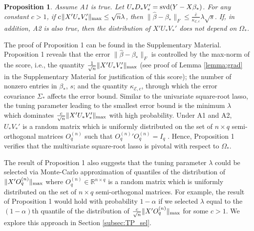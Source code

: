 \documentclass[12pt]{article}
\newtheorem{prop}{Proposition}
\begin{document}
\begin{prop}
Assume A1 is true. Let $U_* D_* V_*' = {\rm svd}(Y - X\beta_*)$. For any constant $c > 1$,  if $c \hspace{1pt} \|X'U_* V_*'\|_{\rm max} \leq \sqrt{n} \lambda$, then
$\|\hat{\beta} - \beta_*\|_F \leq \frac{\bar{c}}{\kappa_{\mathcal{E},c}}\lambda \sqrt{s}.$
If, in addition, A2 is also true, then the distribution of $X'U_*V_*'$ does not depend on $\Omega_*$. 
\end{prop}
The proof of Proposition 1 can be found in the Supplementary Material. 
Proposition 1 reveals that the error $\|\hat{\beta} - \beta_*\|_F$ is controlled by the max-norm of the score, i.e., the quantity $\frac{1}{\sqrt{n}}\|X'U_* V_*'\|_{\rm max}$ (see proof of Lemma \ref{lemma:grad} in the Supplementary Material for justification of this score); the number of nonzero entries in $\beta_*$, $s$;  and the quantity $\kappa_{\mathcal{E},c}$, through which the error covariance $\Sigma_*$ affects the error bound. Similar to the univariate square-root lasso, the tuning parameter leading to the smallest error bound is the minimum $\lambda$ which dominates $\frac{c}{\sqrt{n}}\|X'U_*V_*'\|_{\rm max}$ with high probability. %
Under A1 and A2, $U_* V_*'$ is a random matrix which is uniformly distributed on the set of $n \times q$ semi-orthogonal matrices $O^{(n)}_q$ such that ${O^{(n)}_q}'O^{(n)}_q = I_q$ \citep{eaton}. Hence, Proposition 1 verifies that the multivariate square-root lasso is pivotal with respect to $\Omega_*$. 


The result of Proposition 1 also suggests that the tuning parameter $\lambda$ could be selected via Monte-Carlo approximation of quantiles of the distribution of $\|X'O^{(n)}_q\|_{\rm max}$ where $O^{(n)}_q \in \mathbb{R}^{n \times q}$ is a random matrix which is uniformly distributed on the set of $n \times q$ semi-orthogonal matrices. For example, the result of Proposition 1 would hold with probability $1 - \alpha$ if we selected $\lambda$ equal to the $(1-\alpha)$th quantile of the distribution of $\frac{c}{\sqrt{n}}\|X'O^{(n)}_q\|_{\rm max}$ for some $c>1$. We explore this approach in Section \ref{subsec:TP_sel}. 
\end{document}
